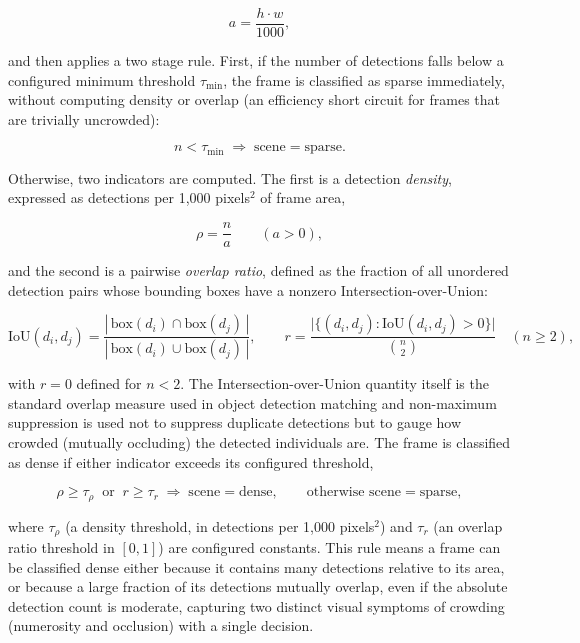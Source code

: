 \documentclass[12pt,a4paper]{report}
\begin{document}
\begin{equation}
	a = \frac{h \cdot w}{1000},
\end{equation}

and then applies a two stage rule. First, if the number of detections falls below a configured minimum threshold $\tau_{\min}$, the frame is classified as sparse immediately, without computing density or overlap (an efficiency short circuit for frames that are trivially uncrowded):

\begin{equation}
	n < \tau_{\min} \;\Rightarrow\; \text{scene} = \text{sparse}.
\end{equation}

Otherwise, two indicators are computed. The first is a detection \emph{density}, expressed as detections per 1{,}000 pixels$^2$ of frame area,

\begin{equation}
	\rho = \frac{n}{a} \qquad (a>0),
\end{equation}

and the second is a pairwise \emph{overlap ratio}, defined as the fraction of all unordered detection pairs whose bounding boxes have a nonzero Intersection-over-Union:

\begin{equation}
	\text{IoU}(d_i,d_j) = \frac{|\,\text{box}(d_i) \cap \text{box}(d_j)\,|}{|\,\text{box}(d_i) \cup \text{box}(d_j)\,|}, \qquad
	r = \frac{\bigl|\{(d_i,d_j) : \text{IoU}(d_i,d_j) > 0\}\bigr|}{\binom{n}{2}} \quad (n \ge 2),
\end{equation}

with $r = 0$ defined for $n<2$. The Intersection-over-Union quantity itself is the standard overlap measure used in object detection matching and non-maximum suppression is used not to suppress duplicate detections but to gauge how crowded (mutually occluding) the detected individuals are. The frame is classified as dense if either indicator exceeds its configured threshold,

\begin{equation}
	\rho \ge \tau_{\rho} \;\;\text{or}\;\; r \ge \tau_{r} \;\Rightarrow\; \text{scene} = \text{dense}, \qquad \text{otherwise scene} = \text{sparse},
\end{equation}

where $\tau_{\rho}$ (a density threshold, in detections per 1{,}000 pixels$^2$) and $\tau_{r}$ (an overlap ratio threshold in $[0,1]$) are configured constants. This rule means a frame can be classified dense either because it contains many detections relative to its area, or because a large fraction of its detections mutually overlap, even if the absolute detection count is moderate, capturing two distinct visual symptoms of crowding (numerosity and occlusion) with a single decision. 
\end{document}
